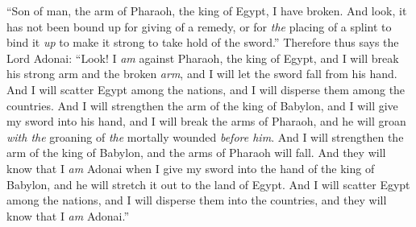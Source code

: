 \begin{biblechapter}
\verse “Son of man, the arm of Pharaoh, the king of Egypt, I have broken. And look, it has not been bound up for giving of a remedy, or for \textit{the} placing of a splint to bind it \textit{up} to make it strong to take hold of the sword.”
\verse Therefore thus says the Lord Adonai: “Look! I \textit{am} against Pharaoh, the king of Egypt, and I will break his strong arm and the broken \textit{arm}, and I will let the sword fall from his hand.
\verse And I will scatter Egypt among the nations, and I will disperse them among the countries.
\verse And I will strengthen the arm of the king of Babylon, and I will give my sword into his hand, and I will break the arms of Pharaoh, and he will groan \textit{with the} groaning of \textit{the} mortally wounded \textit{before him}.
\verse And I will strengthen the arm of the king of Babylon, and the arms of Pharaoh will fall. And they will know that I \textit{am} Adonai when I give my sword into the hand of the king of Babylon, and he will stretch it out to the land of Egypt.
\verse And I will scatter Egypt among the nations, and I will disperse them into the countries, and they will know that I \textit{am} Adonai.”
\end{biblechapter}

